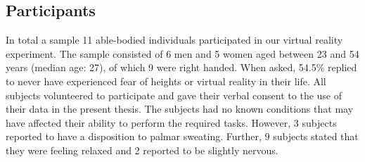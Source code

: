 \subsection{Participants}
In total a sample 11 able-bodied individuals participated in our virtual reality experiment. The sample consisted of 6 men and 5 women aged between 23 and 54 years (median age: 27), of which 9 were right handed. When asked, 54.5\% replied to never have experienced fear of heights or virtual reality in their life. All subjects volunteered to participate and gave their verbal consent to the use of their data in the present thesis. The subjects had no known conditions that may have affected their ability to perform the required tasks. However, 3 subjects reported to have a disposition to palmar sweating. Further, 9 subjects stated that they were feeling relaxed and 2 reported to be slightly nervous.

